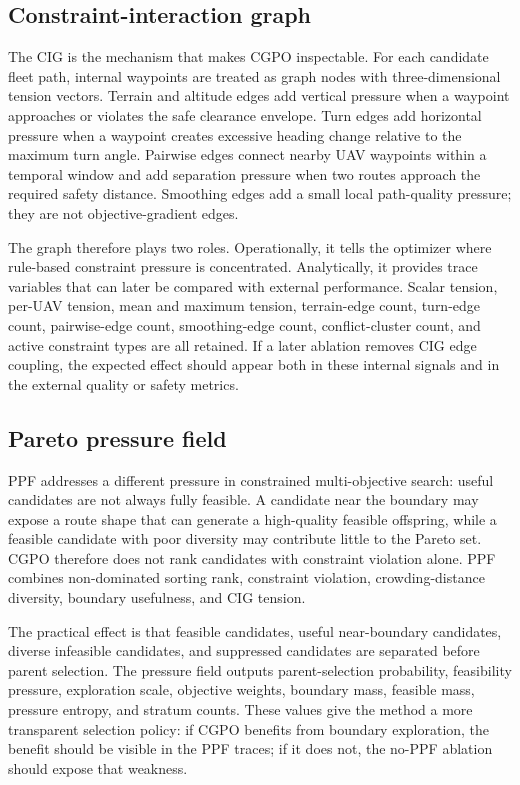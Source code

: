 \subsection{Constraint-interaction graph}
\label{subsec:cig}

The CIG is the mechanism that makes CGPO inspectable. For each candidate fleet path, internal waypoints are treated as graph nodes with three-dimensional tension vectors. Terrain and altitude edges add vertical pressure when a waypoint approaches or violates the safe clearance envelope. Turn edges add horizontal pressure when a waypoint creates excessive heading change relative to the maximum turn angle. Pairwise edges connect nearby UAV waypoints within a temporal window and add separation pressure when two routes approach the required safety distance. Smoothing edges add a small local path-quality pressure; they are not objective-gradient edges.

The graph therefore plays two roles. Operationally, it tells the optimizer where rule-based constraint pressure is concentrated. Analytically, it provides trace variables that can later be compared with external performance. Scalar tension, per-UAV tension, mean and maximum tension, terrain-edge count, turn-edge count, pairwise-edge count, smoothing-edge count, conflict-cluster count, and active constraint types are all retained. If a later ablation removes CIG edge coupling, the expected effect should appear both in these internal signals and in the external quality or safety metrics.

\subsection{Pareto pressure field}
\label{subsec:ppf}

PPF addresses a different pressure in constrained multi-objective search: useful candidates are not always fully feasible. A candidate near the boundary may expose a route shape that can generate a high-quality feasible offspring, while a feasible candidate with poor diversity may contribute little to the Pareto set. CGPO therefore does not rank candidates with constraint violation alone. PPF combines non-dominated sorting rank, constraint violation, crowding-distance diversity, boundary usefulness, and CIG tension.

The practical effect is that feasible candidates, useful near-boundary candidates, diverse infeasible candidates, and suppressed candidates are separated before parent selection. The pressure field outputs parent-selection probability, feasibility pressure, exploration scale, objective weights, boundary mass, feasible mass, pressure entropy, and stratum counts. These values give the method a more transparent selection policy: if CGPO benefits from boundary exploration, the benefit should be visible in the PPF traces; if it does not, the no-PPF ablation should expose that weakness.

